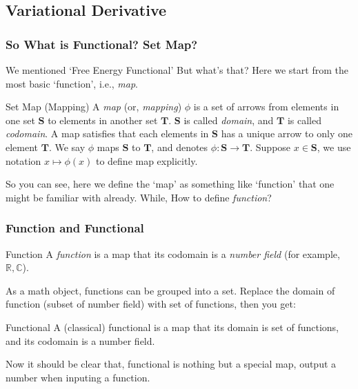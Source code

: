\documentclass[compress]{beamer}
\begin{document}
\subsection{Variational Derivative}
\begin{frame}
  \frametitle{So What is Functional? Set Map?}
  We mentioned `Free Energy Functional' But what's that?
  Here we start from the most basic `function', i.e., \emph{map}.
  \begin{block}{Set Map (Mapping)}
    A \emph{map} (or, \emph{mapping}) \(\phi\) is a set of arrows from elements in one set \(\mathbf{S}\) to elements in another set \(\mathbf{T}\).
    \(\mathbf{S}\) is called \emph{domain}, and \(\mathbf{T}\) is called \emph{codomain}.
    A map satisfies that each elements in \(\mathbf{S}\) has a unique arrow to only one element \(\mathbf{T}\). We say \(\phi\) maps \(\mathbf{S}\) to \(\mathbf{T}\),
    and denotes \(\phi : \mathbf{S} \to \mathbf{T}\). Suppose \(x \in \mathbf{S}\), we use notation \(x \mapsto \phi(x)\) to define map explicitly.
  \end{block}
  So you can see, here we define the `map' as something like `function' that one might be familiar with already. While, How to define \emph{function}?
\end{frame}

\begin{frame}
  \frametitle{Function and Functional}
  \begin{block}{Function}
    A \emph{function} is a map that its codomain is a \emph{number field} (for example, \(\mathbb{R}, \mathbb{C}\)).
  \end{block}
  As a math object, functions can be grouped into a set. Replace the domain of function (subset of number field) with
  set of functions, then you get:
  \begin{block}{Functional}
    A (classical) functional is a map that its domain is set of functions, and its codomain is a number field.
  \end{block}
  Now it should be clear that, functional is nothing but a special map, output a number when inputing a function.
\end{frame}
\end{document}
